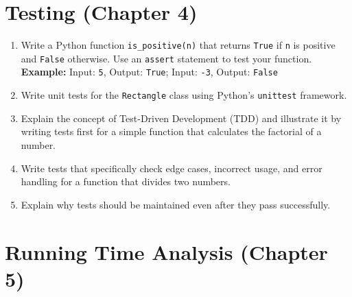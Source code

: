 \documentclass{article}
\begin{document}
\section*{Testing (Chapter 4)}

\begin{enumerate}
    \item Write a Python function \texttt{is\_positive(n)} that returns \texttt{True} if \texttt{n} is positive and \texttt{False} otherwise. Use an \texttt{assert} statement to test your function.\\
    \textbf{Example:} Input: \texttt{5}, Output: \texttt{True}; Input: \texttt{-3}, Output: \texttt{False}

    \item Write unit tests for the \texttt{Rectangle} class using Python's \texttt{unittest} framework.

    \item Explain the concept of Test-Driven Development (TDD) and illustrate it by writing tests first for a simple function that calculates the factorial of a number.

    \item Write tests that specifically check edge cases, incorrect usage, and error handling for a function that divides two numbers.

    \item Explain why tests should be maintained even after they pass successfully.
\end{enumerate}

\section*{Running Time Analysis (Chapter 5)}
\end{document}
